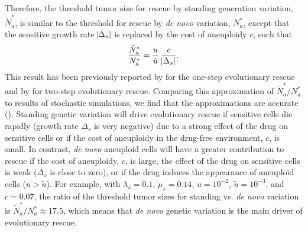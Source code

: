 \documentclass[12pt]{extarticle}
\begin{document}
Therefore, the threshold tumor size for rescue by standing generation variation, $\tilde{N}^*_{a}$, is similar to the threshold for rescue by \textit{de novo} variation, $N^*_a$, except that the sensitive growth rate $\abs{\Delta_s}$ is replaced by the cost of aneuploidy $c$, such that
\begin{equation}\label{eq:Nsgv}
\frac{\tilde{N}^*_{a}}{N^*_{a}} = \frac{u}{\tilde{u}} \; \frac{c}{\abs{\Delta_s}}.
\end{equation}
This result has been previously reported by \citet{orr2008population} for the one-step evolutionary rescue and by \citet{martin2013probability} for two-step evolutionary rescue. %
Comparing this approximation of $\tilde{N}^*_{a}/N^*_{a}$ to results of stochastic simulations, we find that the approximations are accurate (). 
Standing genetic variation will drive evolutionary rescue if sensitive cells die rapidly (growth rate $\Delta_s$ is very negative) due to a strong effect of the drug on sensitive cells or if the cost of aneuploidy in the drug-free environment, $c$, is small.  
In contrast, \textit{de novo} aneuploid cells will have a greater contribution to rescue if the cost of aneuploidy, $c$, is large, the effect of the drug on sensitive cells is weak ($\Delta_s$ is close to zero), or if the drug induces the appearance of aneuploid cells ($u > \tilde u$).
For example, with  $\lambda_s=0.1$, $\mu_s=0.14$, $u=10^{-2}$, $\tilde{u}=10^{-3}$, and $c=0.07$, the ratio of the threshold tumor sizes for standing vs. \textit{de novo} variation is $\tilde{N}^*_a/N^*_a \approx 17.5$, which means that \textit{de novo} genetic variation is  the main driver of evolutionary rescue.
\end{document}

